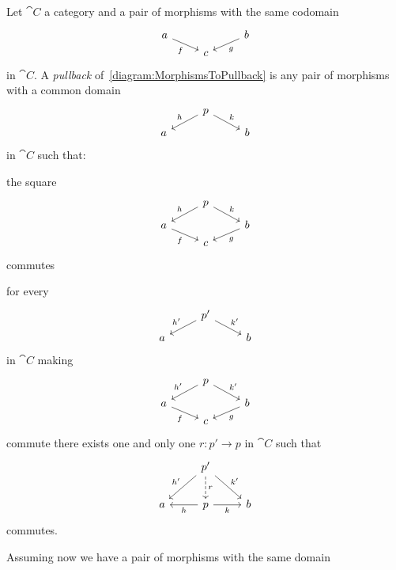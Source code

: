 \begin{definition}
  Let \(\cat C\) a category and a pair of morphisms with the same
  codomain
  \begin{equation}
    \begin{tikzcd}[row sep=tiny]
      a \ar["f", dr, swap] &   & b \ar["g", dl] \\
      & c &
    \end{tikzcd}
    \label{diagram:MorphismsToPullback}\end{equation}
  in \(\cat C\). A {\em pullback}
  of~\eqref{diagram:MorphismsToPullback} is any pair of morphisms with
  a common domain
  \[\begin{tikzcd}[row sep=tiny]
      & p \ar["h", dl, swap] \ar["k", dr] &   \\
      a & & b
    \end{tikzcd}\] in \(\cat C\) such that:
  \begin{tcbitem}
  \item the square
    \[\begin{tikzcd}[row sep=tiny]
        & p \ar["h", dl, swap] \ar["k", dr] &   \\
        a \ar["f", dr, swap] &   & b \ar["g", dl] \\
        & c &
      \end{tikzcd}\] commutes
  \item for every
    \[\begin{tikzcd}[row sep=tiny]
        & p' \ar["{h'}", dl, swap] \ar["{k'}", dr] &   \\
        a & & b
      \end{tikzcd}\] in \(\cat C\)
    making
    \[\begin{tikzcd}[row sep=tiny]
        & p \ar["{h'}", dl, swap] \ar["{k'}", dr] &   \\
        a \ar["f", dr, swap] &   & b \ar["g", dl] \\
        & c &
      \end{tikzcd}\] commute there exists one and only one
    \(r : p' \to p\) in \(\cat C\) such that
    \[\begin{tikzcd}
        & p' \ar["{h'}", dl, swap] \ar["r", d, dashed] \ar["{k'}", dr] & \\
        a & p \ar["h", l] \ar["k", r, swap] & b
      \end{tikzcd}\] commutes.
  \end{tcbitem}
  Assuming now we have a pair of morphisms with the same domain

\end{definition}
